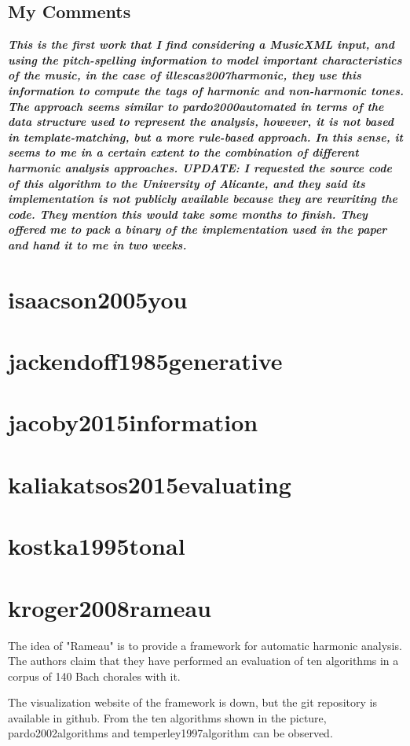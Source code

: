 		\subsection{My Comments}
			\emph{\textbf{
				This is the first work that I find considering a MusicXML input, and using the pitch-spelling information to model important characteristics of the music, in the case of illescas2007harmonic, they use this information to compute the tags of harmonic and non-harmonic tones. The approach seems similar to pardo2000automated in terms of the data structure used to represent the analysis, however, it is not based in template-matching, but a more rule-based approach. In this sense, it seems to me in a certain extent to the combination of different harmonic analysis approaches. UPDATE: I requested the source code of this algorithm to the University of Alicante, and they said its implementation is not publicly available because they are rewriting the code. They mention this would take some months to finish. They offered me to pack a binary of the implementation used in the paper and hand it to me in two weeks.
			}}


	\section{isaacson2005you }
	\section{jackendoff1985generative }
	\section{jacoby2015information }
	\section{kaliakatsos2015evaluating }
	\section{kostka1995tonal }
	\section{kroger2008rameau }
		The idea of "Rameau" is to provide a framework for automatic harmonic analysis. The authors claim that they have performed an evaluation of ten algorithms in a corpus of 140 Bach chorales with it.

		The visualization website of the framework is down, but the git repository is available in github. From the ten algorithms shown in the picture, pardo2002algorithms and temperley1997algorithm can be observed.

